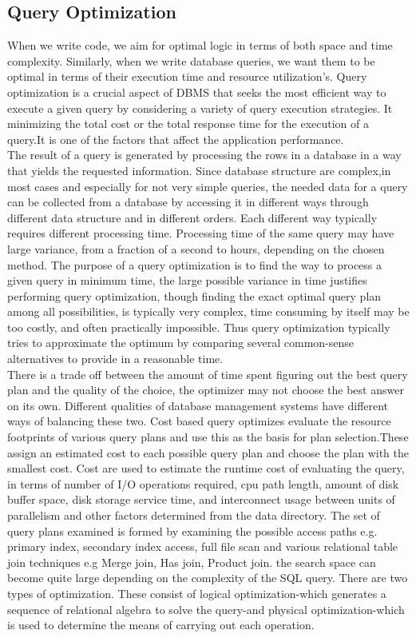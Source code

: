 \subsection{Query Optimization }When we write code, we aim for optimal logic in terms of both space and time complexity. Similarly, when we write database queries, we want them to be optimal in terms of their execution time and resource utilization's. Query optimization is  a crucial aspect of DBMS that seeks the most efficient way to execute a given query by considering a variety of query execution strategies. It minimizing the total cost or the total response time for the execution of a query.It is one of the factors that affect the application performance.\\
The result of a query is generated by processing the rows in a database in a way that yields the requested information. Since database structure are complex,in most cases and especially for not very simple queries, the needed data for a query can be collected from a database by accessing it  in different ways through different data structure and in different orders\cite{selinger-1979}. Each different way typically requires different processing time. Processing time of the same query may have large variance, from a fraction of a second to hours, depending on the chosen method. The purpose of a query optimization is to find the way to process a given query in minimum time, the large possible variance in time justifies performing query optimization, though finding the exact optimal query plan among all possibilities, is typically very complex, time consuming by itself may be too costly, and often practically impossible. Thus query optimization typically tries to approximate the optimum by comparing several common-sense alternatives to provide in a reasonable time.\\
There is a trade off between the amount of time spent figuring out the best query plan and the quality of the choice, the optimizer may not choose the best answer on its own. Different qualities of database management systems have different ways of balancing these two. Cost based query optimizes  evaluate the resource footprints of various query plans and use this as the basis for plan selection.These assign an estimated cost to each possible query plan and choose the plan with the smallest cost. Cost are used to estimate the runtime cost of evaluating the query, in terms of number of I/O operations required, cpu path length, amount of disk buffer space, disk storage service time, and interconnect usage between units of parallelism and other factors determined from the data directory. The set of query plans examined is formed by examining the possible access paths e.g. primary index, secondary index access, full file scan and various relational table join techniques e.g Merge join, Has join, Product join. the search space can become  quite large depending on the complexity of the SQL query. There are two types of optimization. These consist of logical optimization-which generates a sequence of relational algebra to solve the query-and physical optimization-which is used to determine the means of carrying out each operation.\cite{dremio-2024,wikipedia-contributors-2023}\\


